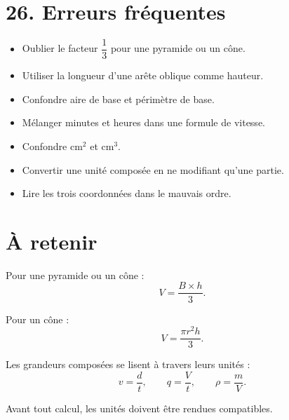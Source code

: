 \section{26. Erreurs fréquentes}

\begin{itemize}
\item Oublier le facteur $\dfrac13$ pour une pyramide ou un cône.
\item Utiliser la longueur d'une arête oblique comme hauteur.
\item Confondre aire de base et périmètre de base.
\item Mélanger minutes et heures dans une formule de vitesse.
\item Confondre $\text{cm}^2$ et $\text{cm}^3$.
\item Convertir une unité composée en ne modifiant qu'une partie.
\item Lire les trois coordonnées dans le mauvais ordre.
\end{itemize}

\section{À retenir}

\begin{aretenir}
Pour une pyramide ou un cône :
\[
\boxed{
V=\dfrac{B\times h}{3}
}.
\]

Pour un cône :
\[
\boxed{
V=\dfrac{\pi r^2h}{3}
}.
\]

Les grandeurs composées se lisent à travers leurs unités :
\[
\boxed{
v=\dfrac dt,\qquad
q=\dfrac Vt,\qquad
\rho=\dfrac mV
}.
\]

Avant tout calcul, les unités doivent être rendues compatibles.
\end{aretenir}
